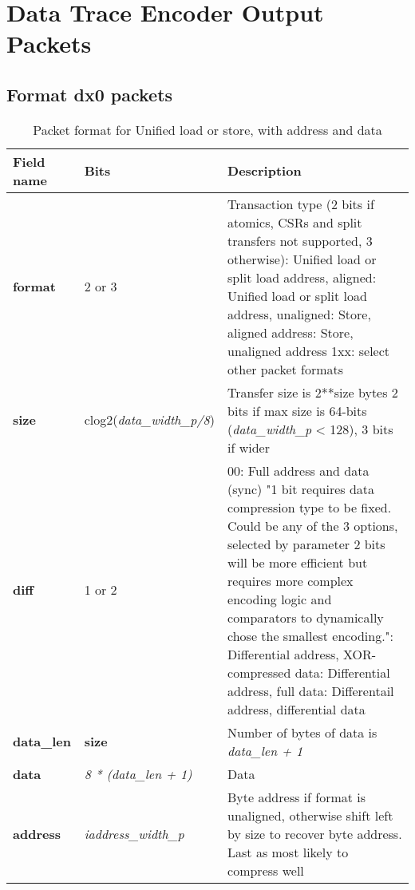 \chapter{Data Trace Encoder Output Packets} \label{dataTracePackets}

\section{Format dx0 packets} \label{sec:formatdx0}

\begin{table}[htp]
  \centering
  \caption{Packet format for Unified load or store, with address and data}
  \label{tab:te_datadx0y0}
  \begin{tabulary}{\textwidth}{|l|p{40mm}|p{90mm}|}
    \hline
    {\bf Field name} & {\bf Bits} & {\bf Description} \\
    \hline
    \textbf{format} & 	2 or 3	& Transaction type (2 bits if atomics, CSRs and split transfers not supported, 3 otherwise): Unified load or split load address, aligned: Unified load or split load address, unaligned: Store, aligned address: Store, unaligned address\newline	
		1xx: select other packet formats\\
    \hline
    \textbf{size} & clog2(\textit{data\_width\_p/8}) & Transfer size is 2**size bytes	2 bits if max size is 64-bits (\textit{data\_width\_p} < 128), 3 bits if wider \\
    \hline
    \textbf{diff} & 1 or 2 & 00: Full address and data (sync)	"1 bit requires data compression type to be fixed.  Could be any of the 3 options, selected by parameter
    2 bits will be more efficient but requires more complex encoding logic and comparators to dynamically chose the smallest encoding.":  Differential address, XOR-compressed data: Differential address, full data: Differentail address, differential data\\
    \hline
    \textbf{data\_len}	& \textbf{size} & Number of bytes of data is \textit {data\_len + 1}	\\
    \hline
    \textbf{data} & \textit {8 * (data\_len + 1)} & 
                Data\\
    \hline
    \textbf{address} &  \textit {iaddress\_width\_p} & Byte address if format is unaligned, otherwise shift left by size to recover byte address. Last as most likely to compress well \\
    \hline
  \end{tabulary}
\end{table}


